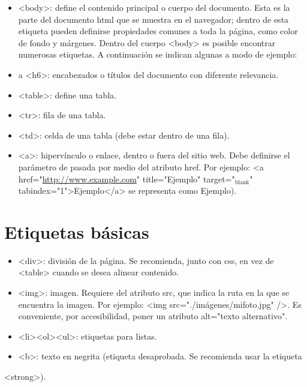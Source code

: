 \documentclass[11pt]{article}
\begin{document}
\begin{itemize}
\item <body>: define el contenido principal o cuerpo del documento. Esta es la parte
del documento html que se muestra en el navegador; dentro de esta etiqueta
pueden definirse propiedades comunes a toda la página, como color de fondo y
márgenes. Dentro del cuerpo <body> es posible encontrar numerosas etiquetas. A
continuación se indican algunas a modo de ejemplo:

\item <h1> a <h6>: encabezados o títulos del documento con diferente relevancia.

\item <table>: define una tabla.

\item <tr>: fila de una tabla.

\item <td>: celda de una tabla (debe estar dentro de una fila).

\item <a>: hipervínculo o enlace, dentro o fuera del sitio web. Debe definirse el
parámetro de pasada por medio del atributo href. Por ejemplo: <a
href="\url{http://www.example.com}" title="Ejemplo" target="\(_{\text{blank}}\)"
tabindex="1">Ejemplo</a> se representa como Ejemplo).
\end{itemize}

\section*{Etiquetas básicas}
\label{sec:orgheadline6}

\begin{itemize}
\item <div>: división de  la página. Se recomienda,  junto con css, en  vez de <table>
cuando se desea alinear contenido.

\item <img>: imagen. Requiere del atributo src, que indica la ruta en la que se
encuentra la imagen. Por ejemplo: <img src="./imágenes/mifoto.jpg" />. Es
conveniente, por accesibilidad, poner un atributo alt="texto alternativo".

\item <li><ol><ul>: etiquetas para listas.

\item <b>: texto en negrita (etiqueta desaprobada. Se recomienda usar la etiqueta
\end{itemize}
<strong>).
\end{document}
